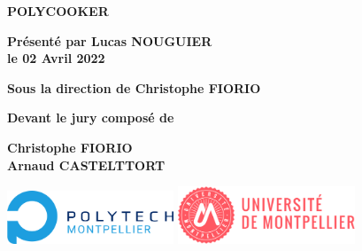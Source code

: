 \documentclass[english,12pt,a4paper]{article}
\begin{document}
\begin{titlepage}
{\bigskip

\color{Titleblue}
\fontsize{17}{20.4}\selectfont
\vspace{2cm}
\textbf{POLYCOOKER}


\vspace{4cm}
\fontsize{15}{18}\selectfont
\color{black}
\textbf{Présenté par Lucas NOUGUIER\\
le 02 Avril 2022}

\bigskip
\fontsize{13}{15.6}\selectfont
\textbf{Sous la direction de Christophe FIORIO}

\vspace{1.5cm}
\normalsize
\textbf{Devant le jury composé de}\\
\bigskip
\fontsize{10}{12}\selectfont
\vspace{1.5mm}
\begin{center}
	\textbf{Christophe FIORIO}\\
	\textbf{Arnaud CASTELTTORT}
\end{center}

\vspace{\fill}
\begin{center}
	\includegraphics[height=60px]{LogoPolytech.png}
	\hfill
	\includegraphics[height=65px]{LogoUM.png}
\end{center}
}
\end{titlepage}

\setlength{\columnsep}{1cm}
\begin{multicols}{2}
	\tableofcontents
\end{multicols}
\pagebreak
\setcounter{section}{0}

\setcounter{section}{0}

\setcounter{section}{0}

\setcounter{section}{0}



\end{document}
